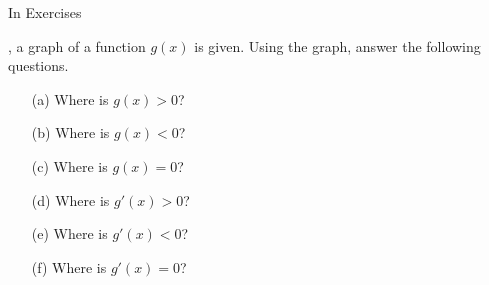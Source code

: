 {\noindent In Exercises}
{, a graph of a function $g(x)$ is given. Using the graph, answer the following questions.

\noindent\begin{minipage}[t]{.49\linewidth}
\begin{enumerate}
\item[(a)]		Where is $g(x) > 0$?
\item[(b)]		Where is $g(x) < 0$?
\item[(c)]		Where is $g(x) = 0$?
\end{enumerate}
\end{minipage}
\begin{minipage}[t]{.49\linewidth}
\begin{enumerate}\addtocounter{enumii}{3}
\item[(d)]		Where is $g'(x) > 0$?
\item[(e)]		Where is $g'(x) < 0$?
\item[(f)]		Where is $g'(x) = 0$?
\end{enumerate}
\end{minipage}
}
